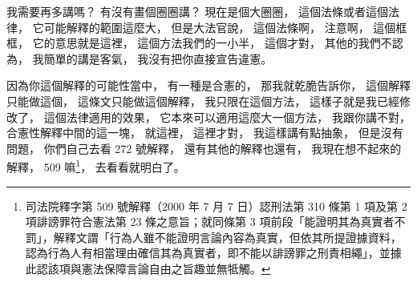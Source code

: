 \hypertarget{w06:cue:595}{}我需要再多講嗎？
\hypertarget{w06:cue:596}{}有沒有畫個圈圈講？
\hypertarget{w06:cue:597}{}現在是個大圈圈，
\hypertarget{w06:cue:598}{}這個法條或者這個法律，
\hypertarget{w06:cue:599}{}它可能解釋的範圍這麼大，
\hypertarget{w06:cue:600}{}但是大法官說，
\hypertarget{w06:cue:601}{}這個法條啊，
\hypertarget{w06:cue:602}{}注意啊，
\hypertarget{w06:cue:603}{}這個框框，
\hypertarget{w06:cue:604}{}它的意思就是這裡，
\hypertarget{w06:cue:605}{}這個方法我們的一小半，
\hypertarget{w06:cue:606}{}這個才對，
\hypertarget{w06:cue:607}{}其他的我們不認為，
\hypertarget{w06:cue:608}{}我簡單的講是客氣，
\hypertarget{w06:cue:609}{}我沒有把你直接宣告違憲。

\hypertarget{w06:cue:610}{}因為你這個解釋的可能性當中，
\hypertarget{w06:cue:611}{}有一種是合憲的，
\hypertarget{w06:cue:612}{}那我就乾脆告訴你，
\hypertarget{w06:cue:613}{}這個解釋只能做這個，
\hypertarget{w06:cue:614}{}這條文只能做這個解釋，
\hypertarget{w06:cue:615}{}我只限在這個方法，
\hypertarget{w06:cue:616}{}這樣子就是我已經修改了，
\hypertarget{w06:cue:617}{}這個法律適用的效果，
\hypertarget{w06:cue:618}{}它本來可以適用這麼大一個方法，
\hypertarget{w06:cue:619}{}我跟你講不對，
\hypertarget{w06:cue:620}{}合憲性解釋中間的這一塊，
\hypertarget{w06:cue:621}{}就這裡，
\hypertarget{w06:cue:622}{}這裡才對，
\hypertarget{w06:cue:623}{}我這樣講有點抽象，
\hypertarget{w06:cue:624}{}但是沒有問題，
\hypertarget{w06:cue:625}{}你們自己去看 272 號解釋，
\hypertarget{w06:cue:626}{}還有其他的解釋也還有，
\hypertarget{w06:cue:627}{}我現在想不起來的解釋，
\hypertarget{w06:cue:628}{}509 嘛\footnote{司法院釋字第 509 號解釋（2000 年 7 月 7 日）認刑法第 310 條第 1 項及第 2 項誹謗罪符合憲法第 23 條之意旨；就同條第 3 項前段「能證明其為真實者不罰」，解釋文謂「行為人雖不能證明言論內容為真實，但依其所提證據資料，認為行為人有相當理由確信其為真實者，即不能以誹謗罪之刑責相繩」，並據此認該項與憲法保障言論自由之旨趣並無牴觸。}，
\hypertarget{w06:cue:629}{}去看看就明白了。


